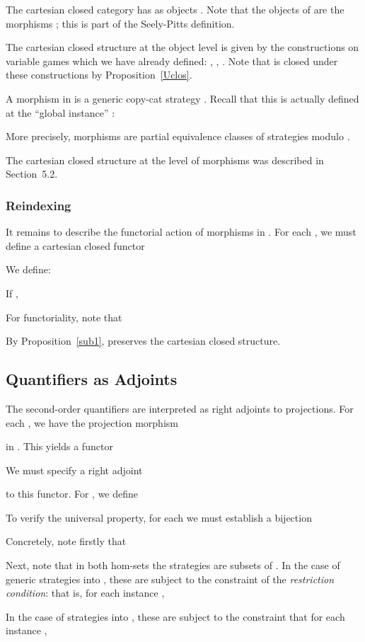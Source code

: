 \documentclass[a4paper,11pt]{article}
\begin{document}
The cartesian closed category  has as objects . Note
that the objects of  are the morphisms ; this
is part of the Seely-Pitts definition.

The cartesian closed structure at the object level is given by the
constructions on variable games which we have already defined: , , . Note that  is closed under these constructions by Proposition~\ref{Uclos}.

A morphism  in  is a generic copy-cat strategy
. Recall that this is actually defined at
the ``global instance'' :

More precisely, morphisms are partial equivalence classes of strategies modulo .

The cartesian closed structure at the level of morphisms was
described in Section~5.2.

\subsubsection*{Reindexing}
It remains to describe the functorial action of morphisms in . For
each , we must define a cartesian closed
functor

We define:

If ,

For functoriality, note that

By Proposition~\ref{sub1},  preserves the cartesian
closed structure.

\subsection{Quantifiers as Adjoints}
The second-order quantifiers are interpreted as right adjoints to
projections.
For each , we have the projection morphism

in . This yields a functor

We must specify a right adjoint

to this functor.
For , we define

To verify the universal property, for each  we must
establish a bijection

Concretely, note firstly that

Next, note that in both hom-sets the strategies are subsets of . In the case of generic strategies
   into
  , these are subject to the constraint of the \emph{restriction
    condition}: that is, for each instance ,

In the case of
  strategies  into , these are subject to the
  constraint that for each instance ,
\end{document}
